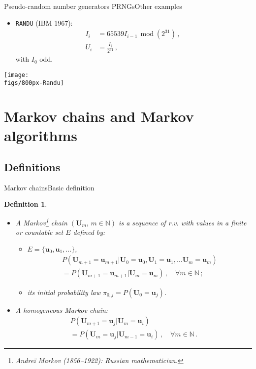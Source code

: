 \documentclass{beamer}
\newcommand{\Nset}{\mathbb{N}}
\newcommand{\ugj}{u}
\newcommand{\ug}{{\boldsymbol\ugj}}
\newcommand{\Ugj}{U}
\newcommand{\Ug}{{\boldsymbol\Ugj}}
\newcommand{\TKij}{\pi}
\newtheorem{mydef}{Definition}
\begin{document}
\begin{frame}{Pseudo-random number generators PRNGs}{Other examples}

\begin{itemize}
\item \texttt{RANDU} ({\footnotesize IBM 1967}):
\begin{displaymath}
\begin{split}
I_{i} &=65539I_{i-1}\,\operatorname{mod}(2^{31})\,,\; \\
U_i &=\frac{I_i}{2^{31}}\,,
\end{split}
\end{displaymath}
with $I_0$ odd.
\end{itemize}
\vspace{-0.2truecm}
\begin{center}
\texttt{[image: \\figs/800px-Randu]}
\end{center}
\end{frame}


\section{Markov chains and Markov algorithms}

\subsection{Definitions}

\begin{frame}{Markov chains}{Basic definition}

\begin{mydef}\begin{itemize}
\item A Markov\footnote{\tiny{Andre\"{i} Markov (1856--1922): Russian mathematician.}} chain $(\Ug_m,\,m\in\Nset)$ is a sequence of r.v. with values in a finite or countable set $E$ defined by:
\begin{itemize}
 \item $E=\{\ug_0,\ug_1,\dots\}$,
\begin{multline*}
P(\Ug_{m+1}=\ug_{m+1}|\Ug_0=\ug_0,\Ug_1=\ug_1,\dots\Ug_m=\ug_m)\\=P(\Ug_{m+1}=\ug_{m+1}|\Ug_m=\ug_m)\,,\quad\forall m\in\Nset\,;
\end{multline*}
\item its initial probability law $\TKij_{0,j}=P(\Ug_0=\ug_j)$.
\end{itemize}
\item A homogeneous Markov chain:
\begin{multline*}
P(\Ug_{m+1}=\ug_j|\Ug_m=\ug_i) \\=P(\Ug_m=\ug_j|\Ug_{m-1}=\ug_i)\,,\quad\forall m\in\Nset\,.
\end{multline*}
\end{itemize}
\end{mydef}

\end{frame}
\end{document}
